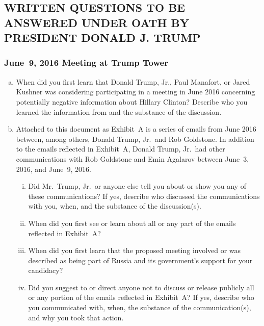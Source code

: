 \hr

\newpage

\subsection{WRITTEN QUESTIONS TO BE ANSWERED UNDER OATH BY PRESIDENT DONALD J. TRUMP}

\subsubsection{June~9, 2016 Meeting at Trump Tower}

\begin{enumerate}[a.]

\item When did you first learn that Donald Trump, Jr., Paul Manafort, or Jared Kushner was considering participating in a meeting in June 2016 concerning potentially negative information about Hillary Clinton?
Describe who you learned the information from and the substance of the discussion.

\item Attached to this document as Exhibit~A is a series of emails from June 2016 between, among others, Donald Trump, Jr.\ and Rob Goldstone.
In addition to the emails reflected in Exhibit~A, Donald Trump, Jr.\ had other communications with Rob Goldstone and Emin Agalarov between June~3, 2016, and June~9, 2016.

\begin{enumerate}[i.]

\item Did Mr.~Trump, Jr.\ or anyone else tell you about or show you any of these communications?
If yes, describe who discussed the communications with you, when, and the substance of the discussion(s).

\item When did you first see or learn about all or any part of the emails reflected in Exhibit~A?

\item When did you first learn that the proposed meeting involved or was described as being part of Russia and its government's support for your candidacy?

\item Did you suggest to or direct anyone not to discuss or release publicly all or any portion of the emails reflected in Exhibit~A? If yes, describe who you communicated with, when, the substance of the communication(s), and why you took that action.


\end{enumerate}
\end{enumerate}
